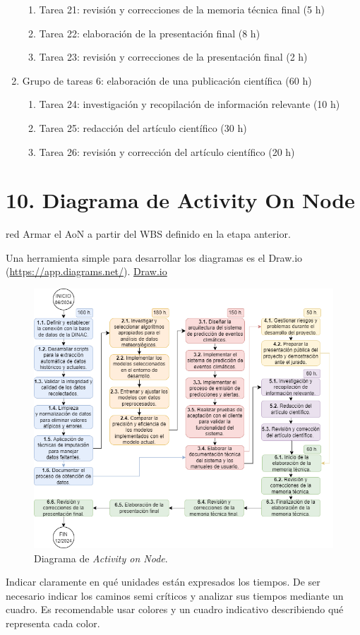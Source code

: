 \documentclass[
11pt, %
codirector, %
]{charter}
\begin{document}
\begin{enumerate}
\begin{enumerate}
	\item Tarea 21: revisión y correcciones de la memoria técnica final (5 h)
	\item Tarea 22: elaboración de la presentación final (8 h)
	\item Tarea 23: revisión y correcciones de la presentación final (2 h)
	\end{enumerate}
\item Grupo de tareas 6: elaboración de una publicación científica (60 h)
\begin{enumerate}
	\item Tarea 24: investigación y recopilación de información relevante (10 h)
	\item Tarea 25: redacción del artículo científico (30 h)
	\item Tarea 26: revisión y corrección del artículo científico (20 h)
	\end{enumerate}
\end{enumerate}

\section{10. Diagrama de Activity On Node}
\label{sec:AoN}

\begin{consigna}{red}
Armar el AoN a partir del WBS definido en la etapa anterior.

Una herramienta simple para desarrollar los diagramas es el Draw.io (\url{https://app.diagrams.net/}).
\href{https://app.diagrams.net}{Draw.io}


\begin{figure}[htpb]
\centering 
\includegraphics[width=.8\textwidth]{./Figuras/AoN.png}
\caption{Diagrama de \textit{Activity on Node}.}
\label{fig:AoN}
\end{figure}

Indicar claramente en qué unidades están expresados los tiempos.
De ser necesario indicar los caminos semi críticos y analizar sus tiempos mediante un cuadro.
Es recomendable usar colores y un cuadro indicativo describiendo qué representa cada color.

\end{consigna}
\end{document}
